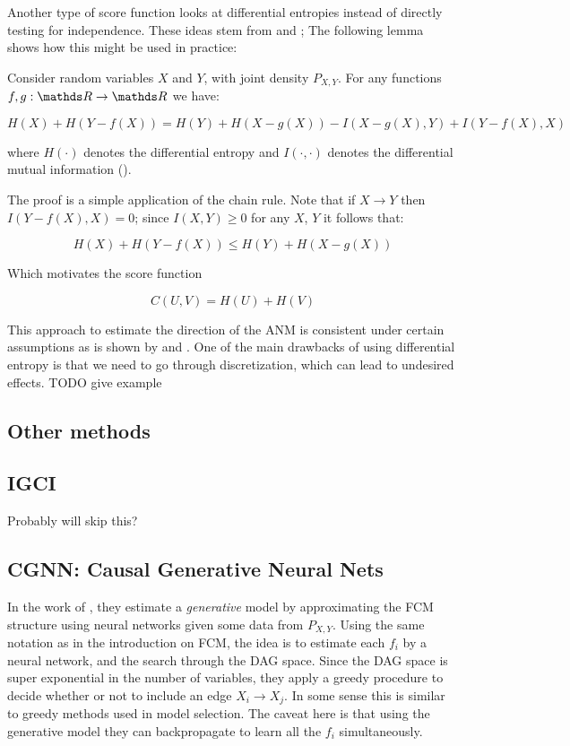 Another type of score function looks at differential entropies instead of directly testing for independence.
These ideas stem from \cite{kpotufe2014consistency} and \cite{nowzohour2016score}; The following lemma shows how this might be used in practice:

\begin{lemma} Consider random variables $X$ and $Y$, with joint density $P_{X, Y}$. For any functions 
$f, g : \R \rightarrow \R$ we have:

$$
    H(X) + H(Y - f(X)) = H(Y) + H(X - g(X)) - I(X - g(X), Y) + I(Y - f(X), X)
$$

where $H(\cdot)$ denotes the differential entropy and $I(\cdot, \cdot)$ denotes the differential mutual information 
(\cite{cover1999elements}).
\end{lemma}

The proof is a simple application of the chain rule. Note that if $X \rightarrow Y$ then $I(Y - f(X), X) = 0$; 
since $I(X, Y) \geq 0$ for any $X$, $Y$ it follows
that:

$$
    H(X) + H(Y - f(X)) \leq  H(Y) + H(X - g(X))
$$

Which motivates the score function

$$
    C(U, V) = H(U) + H(V)
$$

This approach to estimate the direction of the ANM is consistent under certain assumptions as is shown by 
\cite{kpotufe2014consistency} and \cite{nowzohour2016score}. One of the main drawbacks of using differential
entropy is that we need to go through discretization, which can lead to undesired effects.
TODO give example 


\subsection{Other methods}

\subsection{IGCI}

Probably will skip this?


\subsection{CGNN: Causal Generative Neural Nets}

In the work of \cite{goudet2017causal}, they estimate a \textit{generative} model by approximating
the FCM structure using neural networks given some data from $P_{X, Y}$. Using the same notation
as in the introduction on FCM, the idea is to estimate each $f_i$ by a neural network, and the 
search through the DAG space. Since the DAG space is super exponential in the number of variables,
they apply a greedy procedure to decide whether or not to include an edge $X_i \rightarrow X_j$.
In some sense this is similar to greedy methods used in model selection. The caveat here is that
using the generative model they can backpropagate to learn all the $f_i$ simultaneously. 

